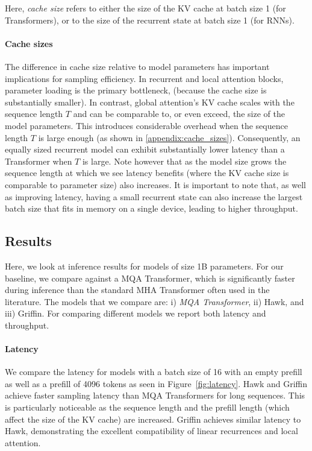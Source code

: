 Here, \textit{cache size} refers to either the size of the KV cache at batch size 1 (for Transformers), or to the size of the recurrent state at batch size 1 (for RNNs).

\paragraph{Cache sizes}

The difference in cache size relative to model parameters has important implications for sampling efficiency. In recurrent and local attention blocks, parameter loading is the primary bottleneck, (because the cache size is substantially smaller). In contrast, global attention's KV cache scales with the sequence length $T$ and can be comparable to, or even exceed, the size of the model parameters. This introduces considerable overhead when the sequence length $T$ is large enough (as shown in \ref{appendix:cache_sizes}).
Consequently, an equally sized recurrent model can exhibit substantially lower latency than a Transformer when $T$ is large. Note however that as the model size grows the sequence length at which we see latency benefits (where the KV cache size is comparable to parameter size) also increases. It is important to note that, as well as improving latency, having a small recurrent state can also increase the largest batch size that fits in memory on a single device, leading to higher throughput.

\subsection{Results}
Here, we look at inference results for models of size 1B parameters. For our baseline, we compare against a MQA Transformer, which is significantly faster during inference than the standard MHA Transformer often used in the literature. The models that we compare are: i) \textit{MQA Transformer}, ii) Hawk, and iii) Griffin. For comparing different models we report both latency and throughput.

\paragraph{Latency}
We compare the latency for models with a batch size of 16 with an empty prefill as well as a prefill of 4096 tokens as seen in Figure~\ref{fig:latency}. 
Hawk and Griffin achieve faster sampling latency than MQA Transformers for long sequences. This is particularly noticeable as the sequence length and the prefill length (which affect the size of the KV cache) are increased. Griffin achieves similar latency to Hawk, demonstrating the excellent compatibility of linear recurrences and local attention.

